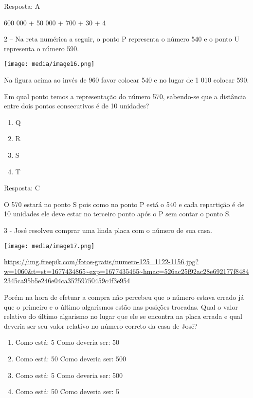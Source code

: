 Resposta: A

600 000 + 50 000 + 700 + 30 + 4

2 -- Na reta numérica a seguir, o ponto P representa o número 540 e o
ponto U representa o número 590.

\texttt{[image: media/image16.png]}

Na figura acima ao invés de 960 favor colocar 540 e no lugar de 1 010
colocar 590.

Em qual ponto temos a representação do número 570, sabendo-se que a
distância entre dois pontos consecutivos é de 10 unidades?

\begin{enumerate}
\def\labelenumi{\alph{enumi})}
\item
  Q
\item
  R
\item
  S
\item
  T
\end{enumerate}

Resposta: C

O 570 estará no ponto S pois como no ponto P está o 540 e cada
repartição é de 10 unidades ele deve estar no terceiro ponto após o P
sem contar o ponto S.

3 - José resolveu comprar uma linda placa com o número de sua casa.

\texttt{[image: media/image17.png]}

\url{https://img.freepik.com/fotos-gratis/numero-125_1122-1156.jpg?w=1060\&t=st=1677434865~exp=1677435465~hmac=526ac25f92ac28e692177f84842345ca95b5e246e04ca35259750459c4f3e954}

Porém na hora de efetuar a compra não percebeu que o número estava
errado já que o primeiro e o último algarismos estão nas posições
trocadas. Qual o valor relativo do último algarismo no lugar que ele se
encontra na placa errada e qual deveria ser seu valor relativo no número
correto da casa de José?

\begin{enumerate}
\def\labelenumi{\alph{enumi})}
\item
  Como está: 5 Como deveria ser: 50
\item
  Como está: 50 Como deveria ser: 500
\item
  Como está: 5 Como deveria ser: 500
\item
  Como está: 50 Como deveria ser: 5
\end{enumerate}

